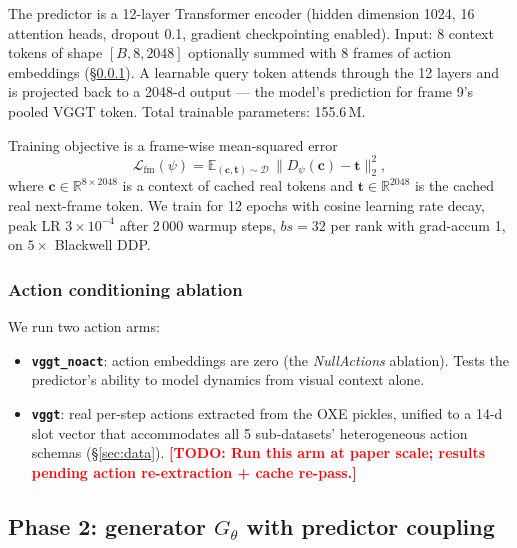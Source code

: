 \documentclass[10pt,letterpaper]{article}
\newcommand{\TODO}[1]{\textcolor{red}{\textbf{[TODO: #1]}}}
\newcommand{\fmloss}{\mathcal{L}_{\text{fm}}}
\begin{document}
The predictor is a 12-layer Transformer encoder (hidden dimension 1024, 16 attention heads, dropout 0.1, gradient checkpointing enabled). Input: 8 context tokens of shape $[B, 8, 2048]$ optionally summed with 8 frames of action embeddings (\S\ref{sec:phase1_arch_actions}). A learnable query token attends through the 12 layers and is projected back to a 2048-d output --- the model's prediction for frame 9's pooled VGGT token. Total trainable parameters: 155.6\,M.

Training objective is a frame-wise mean-squared error
\begin{equation}
\fmloss(\psi) = \mathbb{E}_{(\mathbf{c}, \mathbf{t}) \sim \mathcal{D}}\, \big\| D_\psi(\mathbf{c}) - \mathbf{t} \big\|_2^2,
\end{equation}
where $\mathbf{c} \in \mathbb{R}^{8 \times 2048}$ is a context of cached real tokens and $\mathbf{t} \in \mathbb{R}^{2048}$ is the cached real next-frame token. We train for 12 epochs with cosine learning rate decay, peak LR $3 \times 10^{-4}$ after 2\,000 warmup steps, $bs=32$ per rank with grad-accum 1, on $5 \times$ Blackwell DDP.

\subsubsection{Action conditioning ablation}\label{sec:phase1_arch_actions}

We run two action arms:

\begin{itemize}[leftmargin=*]
\item \textbf{\texttt{vggt\_noact}}: action embeddings are zero (the \emph{NullActions} ablation). Tests the predictor's ability to model dynamics from visual context alone.
\item \textbf{\texttt{vggt}}: real per-step actions extracted from the OXE pickles, unified to a 14-d slot vector that accommodates all 5 sub-datasets' heterogeneous action schemas (\S\ref{sec:data}). \TODO{Run this arm at paper scale; results pending action re-extraction + cache re-pass.}
\end{itemize}

\subsection{Phase 2: generator $G_\theta$ with predictor coupling}\label{sec:phase2_arch}
\end{document}

